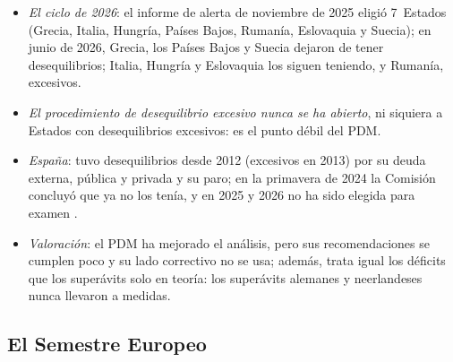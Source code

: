 \documentclass[11pt]{article}
\begin{document}
\begin{itemize}
\item \emph{El ciclo de 2026}: el informe de alerta de noviembre de 2025 eligió 7~Estados (Grecia, Italia, Hungría, Países Bajos, Rumanía, Eslovaquia y Suecia); en junio de 2026, Grecia, los Países Bajos y Suecia dejaron de tener desequilibrios; Italia, Hungría y Eslovaquia los siguen teniendo, y Rumanía, excesivos\nocite{CE2025AMR2026,CE2026PaquetePrimavera}.
\item \emph{El procedimiento de desequilibrio excesivo nunca se ha abierto}, ni siquiera a Estados con desequilibrios excesivos: es el punto débil del PDM.
\item \emph{España}: tuvo desequilibrios desde 2012 (excesivos en 2013) por su deuda externa, pública y privada y su paro; en la primavera de 2024 la Comisión concluyó que ya no los tenía, y en 2025 y 2026 no ha sido elegida para examen\nocite{CE2025PrimaveraPDM} .
\item \emph{Valoración}: el PDM ha mejorado el análisis, pero sus recomendaciones se cumplen poco y su lado correctivo no se usa; además, trata igual los déficits que los superávits solo en teoría: los superávits alemanes y neerlandeses nunca llevaron a medidas.
\end{itemize}

\subsection{El Semestre Europeo}\label{sec:semestre}
\end{document}
